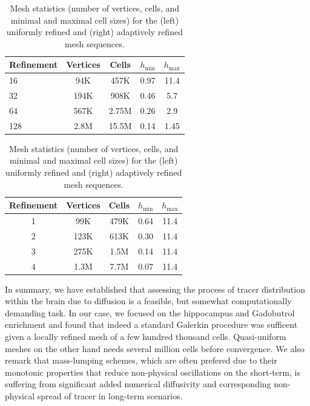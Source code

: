 \begin{table}%
  \centering
  \begin{minipage}{.45\textwidth}%
    \begin{tabular}{l|cccc}
      Refinement & Vertices & Cells  & $h_{\min}$ & $h_{\max}$ \\ \hline
      16 & 94K & 457K & 0.97 & 11.4 \\  
      32 & 194K & 908K &  0.46 & 5.7 \\  
      64 & 567K &  2.75M & 0.26 & 2.9 \\
      128 &  2.8M & 15.5M &  0.14 & 1.45
    \end{tabular}
  \end{minipage}%
  \hspace{2em}
  \begin{minipage}{.45\textwidth}%
    \begin{tabular}{c|cccc}
	    Refinement & Vertices & Cells & $h_{\min}$ & $h_{\max}$ \\ \hline
	     1 & 99K &  479K &  0.64 &  11.4 \\
	     2 & 123K& 613K & 0.30 &  11.4 \\
	     3 & 275K &  1.5M  &  0.14 & 11.4 \\
	     4 & 1.3M &  7.7M  & 0.07 &  11.4 \\
    \end{tabular}
  \end{minipage}%
%
  \caption{Mesh statistics (number of vertices, cells, and minimal and
    maximal cell sizes) for the (left) uniformly refined and
    (right) adaptively refined mesh sequences.}
  \label{chp6:meshstat}
\end{table}


In summary, we have established that assessing the process of  tracer distribution within the brain due to diffusion is a feasible, but somewhat
computationally demanding task. In our case, we focused on the hippocampus and Gadobutrol enrichment and found that indeed 
a standard Galerkin procedure was sufficent given a locally refined mesh of a few hundred thousand cells. Quasi-uniform meshes on the
other hand needs several million cells before convergence. We also remark that mass-lumping schemes, which are often prefered due
to their monotonic properties that reduce non-physical oscillations on the short-term, is suffering from significant added numerical diffusivity
and corresponding non-physical spread of tracer in long-term scenarios.     

